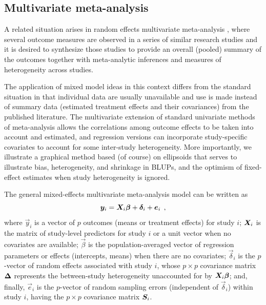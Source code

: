 \subsection{Multivariate meta-analysis}
A related situation arises in random effects multivariate
meta-analysis
\citep{Berkey-etal:1998,Nam-etal:2003},
where several outcome measures are observed in a series of
similar research studies and it is desired to synthesize
those studies to provide an overall (pooled) summary of the outcomes
together with meta-analytic inferences and
measures of heterogeneity across studies.

The application of mixed model ideas in this context differs
from the standard situation in that individual data are
usually unavailable and use is made instead of
summary data (estimated treatment effects and their covariances)
from the published literature. The multivariate extension of standard
univariate methods of meta-analysis allows the correlations among
outcome effects to be taken into account and estimated, and
regression versions can incorporate study-specific covariates to
account for some inter-study heterogeneity. More importantly,
we illustrate a graphical method based (of course) on ellipsoids
that serves to illustrate bias, heterogeneity, and shrinkage in BLUPs,
and the optimism of fixed-effect estimates when
study heterogeneity is ignored.

The general mixed-effects multivariate meta-analysis model can be
written as
\begin{equation}\label{eq:mvmeta1}
	\bm{y}_i = \bm{X}_i \bm{\beta} + \bm{\delta}_i + \bm{e}_i \:\: ,
\end{equation}
where $\vec{y}_i$ is a vector of $p$ outcomes (means or treatment effects)
for study $i$; $\bm{X}_i$ is the matrix of study-level predictors
for study $i$ or a unit vector when no covariates are available;
$\vec{\beta}$ is the population-averaged vector of regression parameters
or effects (intercepts, means) when there are no covariates;
$\vec{\delta}_i$ is the $p$-vector of random effects associated with study $i$,
whose $p\times p$ covariance matrix $\bm{\Delta}$ represents the between-study
heterogeneity unaccounted for by $\bm{X}_i \bm{\beta}$; and,
finally, $\vec{e}_i$ is the $p$-vector of random sampling errors
(independent of $\vec{\delta}_i$)
within study $i$, having the $p\times p$ covariance matrix $\bm{S}_i$.

